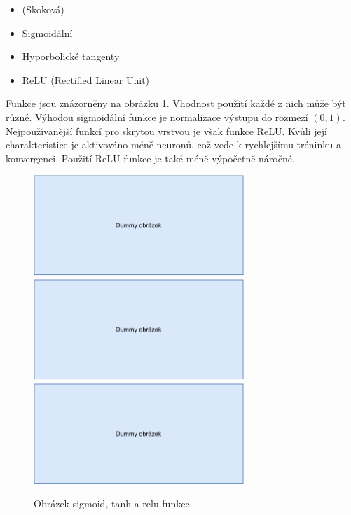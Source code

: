 \begin{itemize}
    \item (Skoková)
    \item Sigmoidální
    \item Hyporbolické tangenty
    \item ReLU (Rectified Linear Unit)
\end{itemize}

Funkce jsou znázorněny na obrázku \ref{aktivacni_funkce}. Vhodnost použití každé z nich může být různé. Výhodou sigmoidální funkce je normalizace výstupu do rozmezí $(0,1)$. Nejpoužívanější funkcí pro skrytou vrstvou je však funkce ReLU. Kvůli její charakteristice je aktivováno méně neuronů, což vede k rychlejšímu tréninku a konvergenci. Použití ReLU funkce je také méně výpočetně náročné\cite{medium:activation_function}.


\begin{figure}[hbt]
	\centering
	\includegraphics[width=0.33\linewidth, height=1.5in]{obrazky/dummy_pic.pdf}\hfill
	\includegraphics[width=0.33\linewidth, height=1.5in]{obrazky/dummy_pic.pdf}\hfill
	\includegraphics[width=0.33\linewidth, height=1.5in]{obrazky/dummy_pic.pdf}\hfill
	\caption{Obrázek sigmoid, tanh a relu funkce}
	\label{aktivacni_funkce}
\end{figure}


